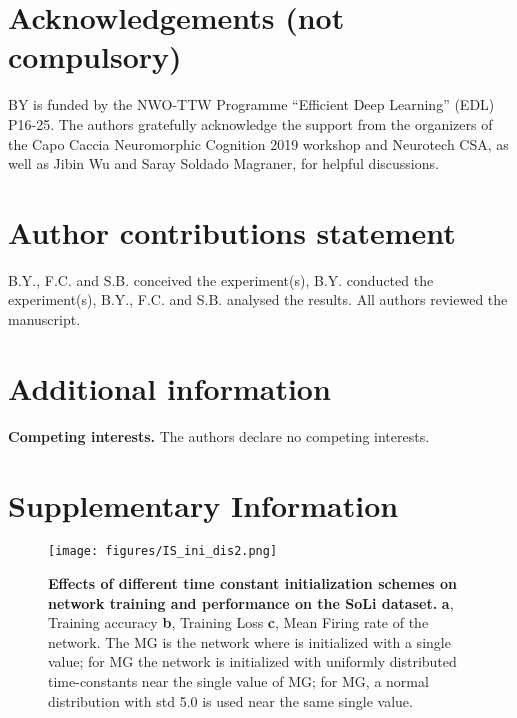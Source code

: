 \documentclass[fleqn,10pt]{wlscirep}
\begin{document}








\section*{Acknowledgements (not compulsory)}



BY is funded by the NWO-TTW Programme “Efficient Deep Learning” (EDL) P16-25.
The authors gratefully acknowledge the support from the organizers of the Capo Caccia Neuromorphic Cognition 2019 workshop and Neurotech CSA, as well as Jibin Wu and Saray Soldado Magraner, for helpful discussions.

\section*{Author contributions statement}
B.Y., F.C. and S.B. conceived the experiment(s),  B.Y. conducted the experiment(s), B.Y., F.C. and S.B. analysed the results. All authors reviewed the manuscript. 

\section*{Additional information}
\textbf{Competing interests.} The authors declare no competing interests. 





\newpage




\renewcommand{\thepage}{S\arabic{page}} 
\renewcommand{\thesection}{S\arabic{section}}  
\renewcommand{\thetable}{S\arabic{table}}  
\renewcommand{\thefigure}{S\arabic{figure}}
\renewcommand{\figurename}{Figure}
\setcounter{figure}{0} 
\setcounter{table}{0} 
\section*{Supplementary Information}





\begin{figure*}[hbp]
    \centering
    \texttt{[image: figures/IS\_ini\_dis2.png]}
    \caption{\textbf{Effects of different time constant initialization schemes on network training and performance on the SoLi dataset.} \textbf{a}, Training accuracy \textbf{b}, Training Loss \textbf{c}, Mean Firing rate of the network. The MG is the network where  is initialized with a single value; for  MG the network is initialized with uniformly distributed time-constants near the single value of MG; for MG, a normal distribution with std 5.0 is used near the same single value.}
    \label{fig:SoLi-ini}
\end{figure*}
\end{document}
